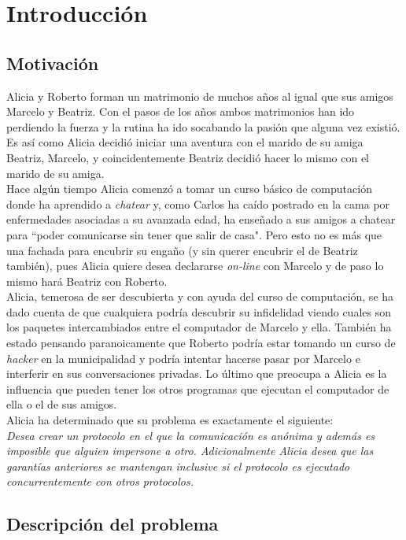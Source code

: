 \chapter{Introducción}

\section{Motivación}

Alicia y Roberto forman un matrimonio de muchos años
al igual que sus amigos Marcelo y Beatriz. Con el pasos de los años
ambos matrimonios han ido perdiendo la fuerza y la rutina ha ido socabando
la pasión que alguna vez existió. Es así como Alicia decidió iniciar una
aventura con el marido de su amiga Beatriz, Marcelo, y coincidentemente
Beatriz decidió hacer lo mismo con el marido de su amiga.\\
Hace algún tiempo Alicia comenzó a tomar un curso básico de computación donde
ha aprendido a \textit{chatear} y, como Carlos ha caído postrado en la cama por
enfermedades asociadas a su avanzada edad, ha enseñado a sus amigos a chatear para
``poder comunicarse sin tener que salir de casa". Pero esto no es más que una fachada
para encubrir su engaño (y sin querer encubrir el de Beatriz también), pues Alicia
quiere desea declararse \textit{on-line} con Marcelo y de paso lo mismo hará Beatriz
con Roberto.\\
Alicia, temerosa de ser descubierta y con ayuda del curso de computación, se ha dado
cuenta de que cualquiera podría descubrir su infidelidad viendo cuales son los paquetes
intercambiados entre el computador de Marcelo y ella. También ha estado pensando paranoicamente
que Roberto podría estar tomando un curso de \textit{hacker} en la municipalidad y podría
intentar hacerse pasar por Marcelo e interferir en sus conversaciones privadas. Lo último que
preocupa a Alicia es la influencia que pueden tener los otros programas que ejecutan el computador
de ella o el de sus amigos.\\
Alicia ha determinado que su problema es exactamente el siguiente:\\
\textit{Desea crear un protocolo  en el que la comunicación es anónima y
además es imposible que alguien impersone a otro. Adicionalmente Alicia desea que las garantías
anteriores se mantengan inclusive si el protocolo es ejecutado concurrentemente con otros protocolos.}\\ 

\section{Descripción del problema}

